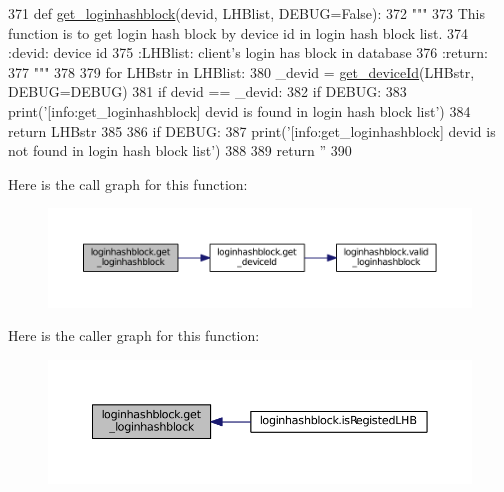 \begin{DoxyCode}
371 \textcolor{keyword}{def }\hyperlink{namespaceloginhashblock_a6187961cb9009c7836e7e6e639085f93}{get\_loginhashblock}(devid, LHBlist, DEBUG=False):
372     \textcolor{stringliteral}{"""}
373 \textcolor{stringliteral}{    This function is to get login hash block by device id in login hash block list.}
374 \textcolor{stringliteral}{    :devid: device id}
375 \textcolor{stringliteral}{    :LHBlist: client's login has block in database}
376 \textcolor{stringliteral}{    :return:}
377 \textcolor{stringliteral}{    """}
378 
379     \textcolor{keywordflow}{for} LHBstr \textcolor{keywordflow}{in} LHBlist:
380         \_devid = \hyperlink{namespaceloginhashblock_a17417f2f6bca76ab51170082a562e5f6}{get\_deviceId}(LHBstr, DEBUG=DEBUG)
381         \textcolor{keywordflow}{if} devid == \_devid:
382             \textcolor{keywordflow}{if} DEBUG:
383                 print(\textcolor{stringliteral}{'[info:get\_loginhashblock] devid is found in login hash block list'})
384             \textcolor{keywordflow}{return} LHBstr
385 
386     \textcolor{keywordflow}{if} DEBUG:
387         print(\textcolor{stringliteral}{'[info:get\_loginhashblock] devid is not found in login hash block list'})
388 
389     \textcolor{keywordflow}{return} \textcolor{stringliteral}{''}
390 
\end{DoxyCode}


Here is the call graph for this function\+:\nopagebreak
\begin{figure}[H]
\begin{center}
\leavevmode
\includegraphics[width=350pt]{namespaceloginhashblock_a6187961cb9009c7836e7e6e639085f93_cgraph}
\end{center}
\end{figure}




Here is the caller graph for this function\+:\nopagebreak
\begin{figure}[H]
\begin{center}
\leavevmode
\includegraphics[width=350pt]{namespaceloginhashblock_a6187961cb9009c7836e7e6e639085f93_icgraph}
\end{center}
\end{figure}


